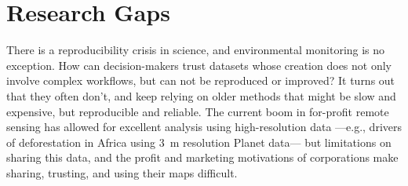     \begin{table}[h]
    \centering
    \caption{Summary of Mapping Products and Data Availability}
    \label{tab:bigmaps}
    \end{table}

\section{Research Gaps}

    There is a reproducibility crisis in science, and environmental monitoring is no exception. How can decision-makers trust datasets whose creation does not only involve complex workflows, but can not be reproduced or improved? It turns out that they often don't, and keep relying on older methods that might be slow and expensive, but reproducible and reliable. The current boom in for-profit remote sensing has allowed for excellent analysis using high-resolution data ---e.g., drivers of deforestation in Africa \citep{masolele2024mapping} using 3~m resolution Planet data--- but limitations on sharing this data, and the profit and marketing motivations of corporations make sharing, trusting, and using their maps difficult.

